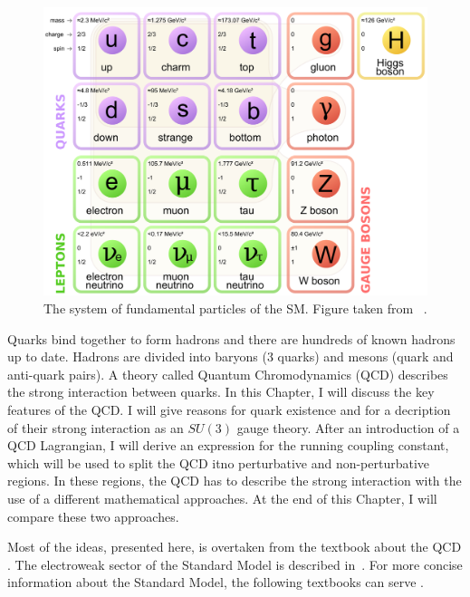 \begin{figure}[t]
  \centering
  \includegraphics[width=\textwidth]{Chapter1/SM.png} 
  \caption[The system of fundamental particles of the SM.]
          {The system of fundamental particles of the SM. Figure taken from~
            \cite{wiki:SMParticlesSource}.} \label{fig:SMparticles}
\end{figure}

Quarks bind together to form hadrons and there are hundreds
\cite{PDG2014} of known hadrons up to date. Hadrons are
divided into baryons (3 quarks) and mesons (quark and anti-quark pairs). 
A theory called Quantum Chromodynamics (QCD) describes the strong interaction
between quarks.  
In this Chapter, I will discuss the key features of the QCD. 
I will give reasons for quark existence and for a decription of their strong
interaction as an $SU(3)$ gauge theory. 
After an introduction of a QCD Lagrangian, I will derive an expression for the
running coupling constant, which will be used to split the QCD itno perturbative
and non-perturbative regions. 
In these regions, the QCD has to describe the strong interaction with the use of
a different mathematical approaches. 
At the end of this Chapter, I will compare
these two approaches.

Most of the ideas, presented here, is overtaken from the textbook 
about the QCD \cite{QCDTextbook}. 
The electroweak sector of the Standard Model is described
in~\cite{horejsi2002fundamentals}. 
For more concise information about the Standard Model, the following textbooks
can serve \cite{griffiths2008introduction,cottingham2007introduction}.

